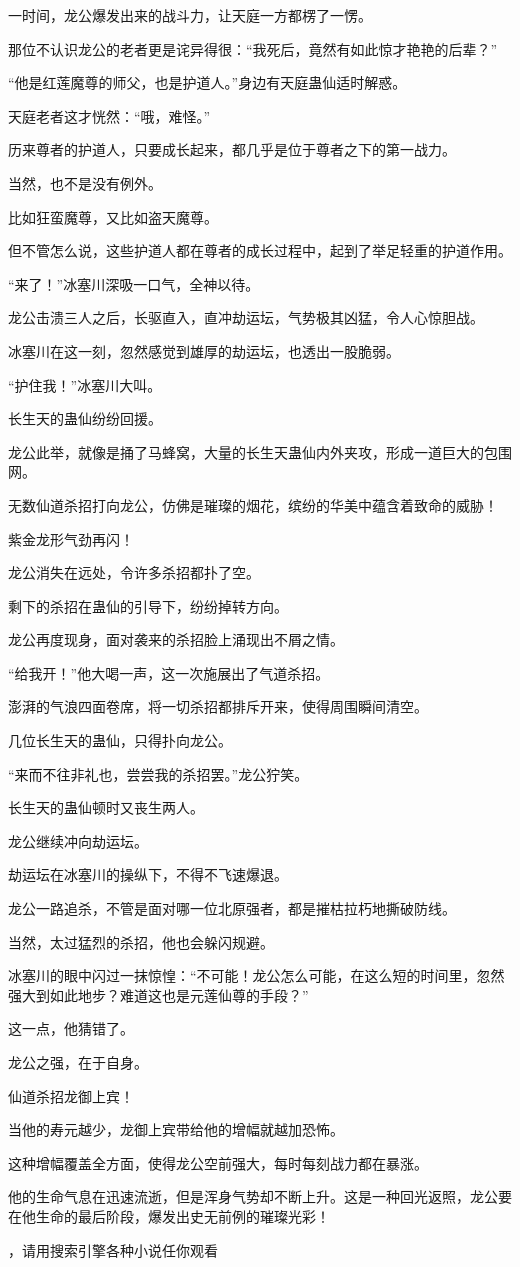 \begin{this_body}
一时间，龙公爆发出来的战斗力，让天庭一方都楞了一愣。

那位不认识龙公的老者更是诧异得很：“我死后，竟然有如此惊才艳艳的后辈？”

“他是红莲魔尊的师父，也是护道人。”身边有天庭蛊仙适时解惑。

天庭老者这才恍然：“哦，难怪。”

历来尊者的护道人，只要成长起来，都几乎是位于尊者之下的第一战力。

当然，也不是没有例外。

比如狂蛮魔尊，又比如盗天魔尊。

但不管怎么说，这些护道人都在尊者的成长过程中，起到了举足轻重的护道作用。

“来了！”冰塞川深吸一口气，全神以待。

龙公击溃三人之后，长驱直入，直冲劫运坛，气势极其凶猛，令人心惊胆战。

冰塞川在这一刻，忽然感觉到雄厚的劫运坛，也透出一股脆弱。

“护住我！”冰塞川大叫。

长生天的蛊仙纷纷回援。

龙公此举，就像是捅了马蜂窝，大量的长生天蛊仙内外夹攻，形成一道巨大的包围网。

无数仙道杀招打向龙公，仿佛是璀璨的烟花，缤纷的华美中蕴含着致命的威胁！

紫金龙形气劲再闪！

龙公消失在远处，令许多杀招都扑了空。

剩下的杀招在蛊仙的引导下，纷纷掉转方向。

龙公再度现身，面对袭来的杀招脸上涌现出不屑之情。

“给我开！”他大喝一声，这一次施展出了气道杀招。

澎湃的气浪四面卷席，将一切杀招都排斥开来，使得周围瞬间清空。

几位长生天的蛊仙，只得扑向龙公。

“来而不往非礼也，尝尝我的杀招罢。”龙公狞笑。

长生天的蛊仙顿时又丧生两人。

龙公继续冲向劫运坛。

劫运坛在冰塞川的操纵下，不得不飞速爆退。

龙公一路追杀，不管是面对哪一位北原强者，都是摧枯拉朽地撕破防线。

当然，太过猛烈的杀招，他也会躲闪规避。

冰塞川的眼中闪过一抹惊惶：“不可能！龙公怎么可能，在这么短的时间里，忽然强大到如此地步？难道这也是元莲仙尊的手段？”

这一点，他猜错了。

龙公之强，在于自身。

仙道杀招龙御上宾！

当他的寿元越少，龙御上宾带给他的增幅就越加恐怖。

这种增幅覆盖全方面，使得龙公空前强大，每时每刻战力都在暴涨。

他的生命气息在迅速流逝，但是浑身气势却不断上升。这是一种回光返照，龙公要在他生命的最后阶段，爆发出史无前例的璀璨光彩！

，请用搜索引擎各种小说任你观看

\end{this_body}

